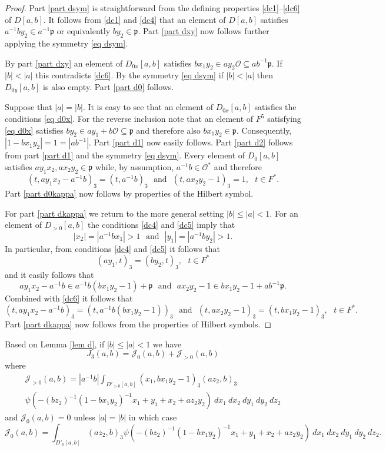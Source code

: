 \documentclass[12pt]{amsart}
\newcommand{\abs}[1]{\left|{#1}\right|}
\newcommand{\p}{\mathfrak{p}}
\newcommand{\J}{\mathcal{J}}
\renewcommand{\O}{\mathcal{O}}
\theoremstyle{remark}
\begin{document}
\begin{proof}
Part \ref{part dsym} is straightforward from the defining properties \ref{dc1}--\ref{dc6} of $D[a,b]$.
It follows from \ref{dc1} and \ref{dc4} that an element of $D[a,b]$ satisfies $a^{-1}by_2\in a^{-1}\p$ or equivalently $by_2\in\p$. Part \ref{part dxy} now follows further applying the symmetry \eqref{eq dsym}. 

By part \ref{part dxy} an element of $D_{0x}[a,b]$ satisfies $bx_1y_2\in ay_2\O\subseteq ab^{-1}\p$. If $\abs{b}<\abs{a}$ this contradicts \ref{dc6}. By the symmetry \eqref{eq dsym} if $\abs{b}<\abs{a}$ then $D_{0y}[a,b]$ is also empty. Part \ref{part d0} follows.

Suppose that $\abs{a}=\abs{b}$. It is easy to see that an element of $D_{0x}[a,b]$ satisfies the conditions \eqref{eq d0x}.  
For the reverse inclusion note that an element of $F^5$  satisfying \eqref{eq d0x} satisfies $by_2\in ay_1+b\O\subseteq \p$ and therefore also $bx_1y_2\in \p$. Consequently, $\abs{1-bx_1y_2}=1=\abs{ab^{-1}}$. Part \ref{part d1} now easily follows. Part \ref{part d2} follows from part \ref{part d1} and the  symmetry \eqref{eq dsym}.
Every element of $D_0[a,b]$ satisfies $ay_1x_2,ax_2y_2\in\p$ while, by assumption, $a^{-1}b\in\O^*$ and therefore
\[
(t,ay_1x_2-a^{-1}b)_3=(t,a^{-1}b)_3\ \ \ \text{and}\ \ \ (t,ax_2y_2-1)_3=1,\ \ \ t\in F^*.
\]
Part \ref{part d0kappa} now follows by properties of the Hilbert symbol. 

For part \ref{part dkappa} we return to the more general setting $\abs{b}\le \abs{a}<1$. For an element of $D_{>0}[a,b]$ the conditions \ref{dc4} and \ref{dc5} imply that
\[
\abs{x_2}=\abs{a^{-1}bx_1}>1\ \ \ \text{and}\ \ \ \abs{y_1}=\abs{a^{-1}by_2}>1.
\]
In particular, from conditions \ref{dc4} and \ref{dc5} it follows that
\[
(ay_1,t)_3=(by_2,t)_3,\ \ \ t\in F^*
\]
and it easily follows that
\[
ay_1x_2-a^{-1}b\in a^{-1}b(bx_1y_2-1)+\p \ \ \ \text{and} \ \ \ ax_2y_2-1\in bx_1y_2-1+ab^{-1}\p.
\]
Combined with \eqref{dc6} it follows that
\[
(t,ay_1x_2-a^{-1}b)_3=(t,a^{-1}b(bx_1y_2-1))_3\ \ \ \text{and}\ \ \ (t,ax_2y_2-1)_3=(t,bx_1y_2-1)_3,\ \ \ t\in F^*.
\]
Part  \ref{part dkappa} now follows from the properties of Hilbert symbols.
\end{proof}

Based on Lemma \ref{lem d}, if $\abs{b}\le \abs{a}<1$ we have
\begin{equation}\label{eq J3}
J_3(a,b)=\J_0(a,b)+\J_{>0}(a,b)
\end{equation}
where 
\begin{multline}\label{eq j>0}
\J_{>0}(a,b)=\abs{a^{-1}b}\int_{D'_{>0}[a,b]} (x_1,bx_1y_2-1)_3(az_2,b)_3\\ \psi(-(b z_2)^{-1}(1-bx_1y_2)^{-1}x_1+y_1+x_2+az_2y_2)\ dx_1\ dx_2\ dy_1\ dy_2\ dz_2
\end{multline}
and $\J_0(a,b)=0$ unless $\abs{a}=\abs{b}$ in which case
\[
\J_0(a,b)=\int_{D'_0[a,b]} (az_2,b)_3\psi(-(b z_2)^{-1}(1-bx_1y_2)^{-1}x_1+y_1+x_2+az_2y_2)\ dx_1\ dx_2\ dy_1\ dy_2\ dz_2.
\]
\end{document}
